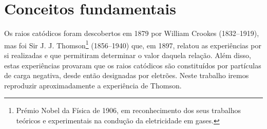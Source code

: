 \documentclass[12pt,a4paper,oneside]{paper}
\begin{document}
\pagestyle{fancy}
\fancyhf{} %

%
% 



\def\title {}


%
% 

 
\normalsize
\cleardoublepage
\setcounter{page}{1}
\selectfont
%
%

\printindex

\section{Conceitos fundamentais}{\label{sec:conceitos}}
Os raios catódicos foram descobertos em 1879 por William Crookes (1832--1919), mas foi Sir J. J. Thomson\footnote{Prémio Nobel da Física de 1906, em reconhecimento dos seus trabalhos teóricos e experimentais na condução da eletricidade em gases.} (1856--1940) que, em 1897, relatou as experiências por si realizadas e que permitiram determinar o valor daquela relação. Além disso, estas experiências provaram que os raios catódicos são constituídos por partículas de carga negativa, desde então designadas por eletrões. Neste trabalho iremos reproduzir aproximadamente a experiência de Thomson.

\end{document}
